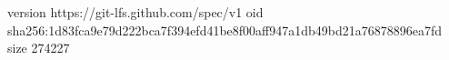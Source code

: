 version https://git-lfs.github.com/spec/v1
oid sha256:1d83fca9e79d222bca7f394efd41be8f00aff947a1db49bd21a76878896ea7fd
size 274227
